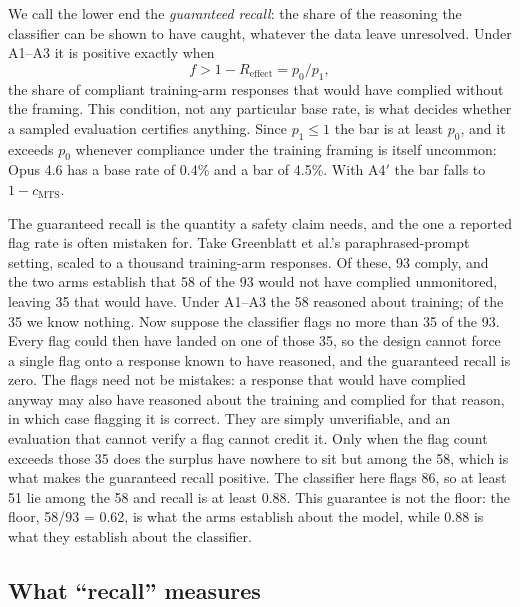 \documentclass[11pt]{article}
\newcommand{\Reff}{R_{\mathrm{effect}}}
\newcommand{\cmts}{c_{\mathrm{MTS}}}
\begin{document}
We call the lower end the \emph{guaranteed recall}: the share of the reasoning the classifier can be shown to have caught, whatever the data leave unresolved. Under A1--A3 it is positive exactly when
\begin{equation*}
f > 1 - \Reff = p_0/p_1,
\end{equation*}
the share of compliant training-arm responses that would have complied without the framing. This condition, not any particular base rate, is what decides whether a sampled evaluation certifies anything. Since $p_1 \leq 1$ the bar is at least $p_0$, and it exceeds $p_0$ whenever compliance under the training framing is itself uncommon: Opus 4.6 has a base rate of 0.4\% and a bar of 4.5\%. With A4$'$ the bar falls to $1 - \cmts$.

The guaranteed recall is the quantity a safety claim needs, and the one a reported flag rate is often mistaken for. Take Greenblatt et al.'s paraphrased-prompt setting, scaled to a thousand training-arm responses. Of these, 93 comply, and the two arms establish that 58 of the 93 would not have complied unmonitored, leaving 35 that would have. Under A1--A3 the 58 reasoned about training; of the 35 we know nothing. Now suppose the classifier flags no more than 35 of the 93. Every flag could then have landed on one of those 35, so the design cannot force a single flag onto a response known to have reasoned, and the guaranteed recall is zero. The flags need not be mistakes: a response that would have complied anyway may also have reasoned about the training and complied for that reason, in which case flagging it is correct. They are simply unverifiable, and an evaluation that cannot verify a flag cannot credit it. Only when the flag count exceeds those 35 does the surplus have nowhere to sit but among the 58, which is what makes the guaranteed recall positive. The classifier here flags 86, so at least 51 lie among the 58 and recall is at least 0.88. This guarantee is not the floor: the floor, 58/93 = 0.62, is what the arms establish about the model, while 0.88 is what they establish about the classifier.

\subsection{What ``recall'' measures}
\end{document}
